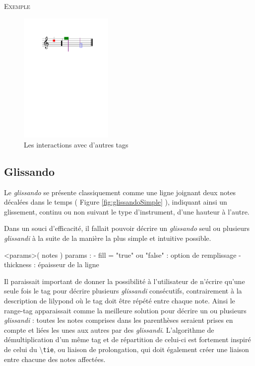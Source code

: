 \documentclass{article}
\newenvironment{gmncode}	{\vspace{-2mm}\small\verbatim}{\endverbatim\vspace{-2mm}}
\newcommand{\code}[1]		{{\small \texttt{#1}}}
\newcommand{\guidotag}[1]	{\textbackslash\code{#1}}
\newcommand{\exemple}		{\vspace{2mm}\hspace*{-6mm}\textsc{Exemple}}
\begin{document}
\exemple
\begin{figure}[h]
\centering
\begin{gmncode}
[
  \cluster<color="red", hdx=1, hdy=3>({a})
  \cluster<size=0.5>({f,c2})
  \noteFormat<color="purple">
  \headsReverse
  \cluster<color="green", size=2>({f, g2})
  \cluster<"blue">({d1/2, g})
]
\end{gmncode}
\includegraphics[width=45mm]{img/partitions/clusterInteractions.pdf}
\caption{Les interactions avec d'autres tags}
\label{fig:clusterInteractions}
\end{figure}
%


\subsection{Glissando}\label{subsec:glissando}

Le \emph{glissando} se présente classiquement comme une ligne joignant deux notes décalées dans le temps ( Figure \ref{fig:glissandoSimple} ), indiquant ainsi un glissement, continu ou non suivant le type d'instrument, d'une hauteur à l'autre.

Dans un souci d'efficacité, il fallait pouvoir décrire un \emph{glissando} seul ou plusieurs \emph{glissandi} à la suite de la manière la plus simple et intuitive possible. 

\begin{gmncode}
  \glissando<params>( notes )
  params : 
    - fill = "true" ou "false" : 
      option de remplissage
    - thickness : épaisseur de la ligne
\end{gmncode}

Il paraissait important de donner la possibilité à l'utilisateur de n'écrire qu'une seule fois le tag pour décrire plusieurs \emph{glissandi} consécutifs, contrairement à la description de lilypond où le tag doit être répété entre chaque note. Ainsi le range-tag apparaissait comme la meilleure solution pour décrire un ou plusieurs \emph{glissandi} : toutes les notes comprises dans les parenthèses seraient prises en compte et liées les unes aux autres par des \emph{glissandi}. L'algorithme de démultiplication d'un même tag et de répartition de celui-ci est fortement inspiré de celui du \guidotag{tie}, ou liaison de prolongation, qui doit également créer une liaison entre chacune des notes affectées.
\end{document}
